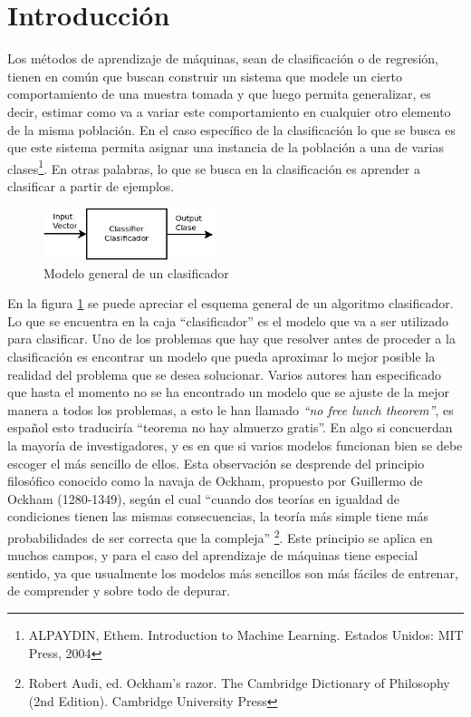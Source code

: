 \documentclass[a4paper, 11pt, oneside]{report}
\begin{document}
\section{Introducción}

Los métodos de aprendizaje de máquinas, sean de clasificación o de regresión, tienen en común que buscan construir un sistema que modele un cierto comportamiento de una muestra tomada y que luego permita generalizar, es decir, estimar como va a variar este comportamiento en cualquier otro elemento de la misma población. En el caso específico de la clasificación lo que se busca es que este sistema permita asignar una instancia de la población a una de varias clases\footnote{ALPAYDIN, Ethem. Introduction to Machine Learning. Estados Unidos: MIT Press, 2004}. En otras palabras, lo que se busca en la clasificación es aprender a clasificar a partir de ejemplos.

	\begin{figure}[htb]
	\begin{center}
	\leavevmode
	\includegraphics[width=5cm]{diagrams/classifier1.jpg}
	\end{center}
	\caption{Modelo general de un clasificador}
	\label{fig:classif1}
	\end{figure}

En la figura \ref{fig:classif1} se puede apreciar el esquema general de un algoritmo clasificador. Lo que se encuentra en la caja ``clasificador'' es el modelo que va a ser utilizado para clasificar. Uno de los problemas que hay que resolver antes de proceder a la clasificación es encontrar un modelo que pueda aproximar lo mejor posible la realidad del problema que se desea solucionar. Varios autores han especificado que hasta el momento no se ha encontrado un modelo que se ajuste de la mejor manera a todos los problemas, a esto le han llamado {\it ``no free lunch theorem''}, es español esto traduciría ``teorema no hay almuerzo gratis''. En algo si concuerdan la mayoría de investigadores, y es en que si varios modelos funcionan bien se debe escoger el más sencillo de ellos. Esta observación se desprende del principio filosófico conocido como la navaja de Ockham, propuesto por Guillermo de Ockham (1280-1349), según el cual ``cuando dos teorías en igualdad de condiciones tienen las mismas consecuencias, la teoría más simple tiene más probabilidades de ser correcta que la compleja'' \footnote{Robert Audi, ed. Ockham's razor. The Cambridge Dictionary of Philosophy (2nd Edition). Cambridge University Press}. Este principio se aplica en muchos campos, y para el caso del aprendizaje de máquinas tiene especial sentido, ya que usualmente los modelos más sencillos son más fáciles de entrenar, de comprender y sobre todo de depurar.
\end{document}
